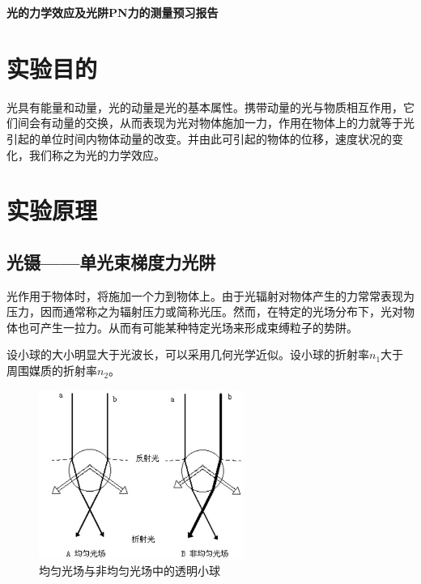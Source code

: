 \documentclass[a4paper,UTF8]{ctexart}
\begin{document}
\begin{center}
    \textbf{\Large 光的力学效应及光阱PN力的测量预习报告}
    \par {}
\end{center}

\section{实验目的}

光具有能量和动量，光的动量是光的基本属性。携带动量的光与物质相互作用，它们间会有动量的交换，从而表现为光对物体施加一力，作用在物体上的力就等于光引起的单位时间内物体动量的改变。并由此可引起的物体的位移，速度状况的变化，我们称之为光的力学效应。


\section{实验原理}

\subsection{光镊——单光束梯度力光阱}

光作用于物体时，将施加一个力到物体上。由于光辐射对物体产生的力常常表现为压力，因而通常称之为辐射压力或简称光压。然而，在特定的光场分布下，光对物体也可产生一拉力。从而有可能某种特定光场来形成束缚粒子的势阱。

设小球的大小明显大于光波长，可以采用几何光学近似。设小球的折射率$n_1$大于周围媒质的折射率$n_2$。

\begin{figure}[H]
    \centering
    \begin{minipage}[b]{0.9\textwidth}
        \centering
        \includegraphics[width=0.6\textwidth]{./fig1.jpg}
        \caption{均匀光场与非均匀光场中的透明小球}
    \end{minipage}
\end{figure}
\end{document}
